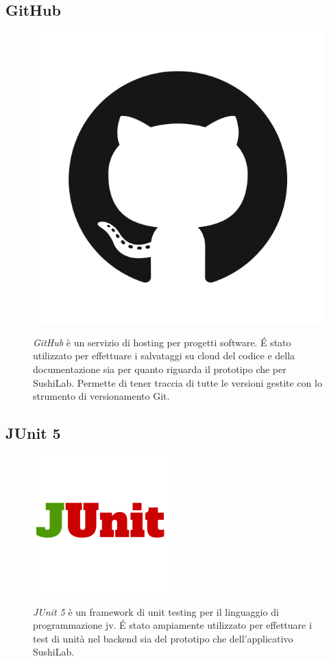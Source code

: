 \subsection*{GitHub}
\begin{figure}[ht]
  \begin{minipage}[h]{0.3\linewidth}
    \centering
    \includegraphics[width=0.5\linewidth]{immagini/github.png}
  \end{minipage}
  \begin{minipage}[!h]{0.7\linewidth}
    \textit{GitHub} è un servizio di hosting per progetti software. É stato utilizzato per effettuare i salvataggi su cloud del codice e della documentazione sia per quanto riguarda il prototipo che per SushiLab. Permette di tener traccia di tutte le versioni gestite con lo strumento di versionamento Git.
  \end{minipage}
\end{figure}
\subsection*{JUnit 5}
\FloatBarrier
\begin{figure}[!h]
  \begin{minipage}[h]{0.3\linewidth}
    \centering
    \includegraphics[width=0.6\linewidth]{immagini/JUnit.png}
  \end{minipage}
  \begin{minipage}[!h]{0.7\linewidth}
    \textit{JUnit 5} è un framework di unit testing per il linguaggio di programmazione \gls{jv}. É stato ampiamente utilizzato per effettuare i test di unità nel backend sia del prototipo che dell'applicativo SushiLab.
  \end{minipage}
\end{figure}
\FloatBarrier
